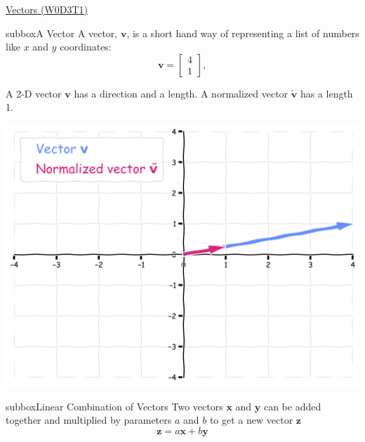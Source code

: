 \begin{textbox}{\href{https://compneuro.neuromatch.io/tutorials/W0D3_LinearAlgebra/student/W0D3_Tutorial1.html}{Vectors (W0D3T1)} }
\begin{subbox}{subbox}{A Vector}
\scriptsize
A vector, $\mathbf{v}$, is a short hand way of representing a list of numbers like $x$ and $y$ coordinates:
\begin{equation}
\mathbf{v} = 
\begin{bmatrix}
4 \\
1
\end{bmatrix},
\end{equation}

A 2-D vector $\mathbf{v}$ has a direction and a length. A normalized vector $\widetilde{\mathbf{v}}$ has a length 1.

\centering
\includegraphics[scale=0.1]{Figures/PreCourse/Figure1.png}
\end{subbox}

\begin{subbox}{subbox}{Linear Combination of Vectors}
\scriptsize
Two vectors $\mathbf{x}$ and $\mathbf{y}$ can be added together and multiplied by parameters $a$ and $b$ to get a new vector $\mathbf{z}$
\begin{equation}
\mathbf{z} = a\mathbf{x} + b\mathbf{y}
\end{equation}


\end{subbox}
\end{textbox}

